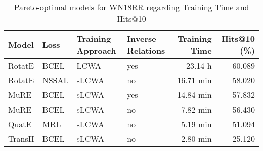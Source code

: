 \begin{table}[H]
\centering
\caption{Pareto-optimal models for WN18RR regarding Training Time and Hits@10}
\label{tab:skyline_wn18rr_training_time}
\begin{tabular}{llllrr}
\toprule
 Model &  Loss & Training Approach & Inverse Relations & Training Time &  Hits@10 (\%) \\
\midrule
RotatE &  BCEL &              LCWA &               yes &       23.14 h &       60.089 \\
RotatE & NSSAL &             sLCWA &                no &     16.71 min &       58.020 \\
  MuRE &  BCEL &             sLCWA &               yes &     14.84 min &       57.832 \\
  MuRE &  BCEL &             sLCWA &                no &      7.82 min &       56.430 \\
 QuatE &   MRL &             sLCWA &                no &      5.19 min &       51.094 \\
TransH &  BCEL &             sLCWA &                no &      2.80 min &       25.120 \\
\bottomrule
\end{tabular}
\end{table}

